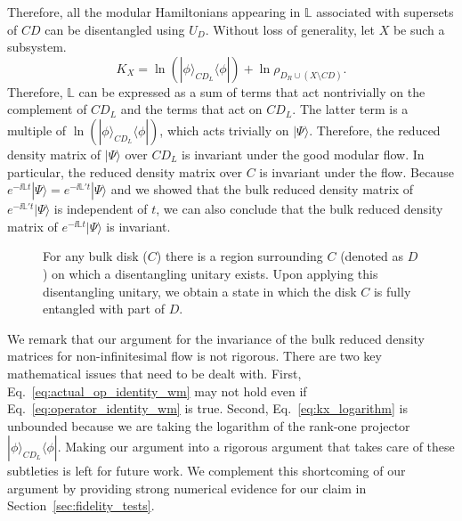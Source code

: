 \documentclass[12pt, nofootinbib]{article}
\theoremstyle{plain}
\theoremstyle{assumption}
\theoremstyle{definition}
\theoremstyle{plain}
\theoremstyle{plain}
\theoremstyle{plain}
\theoremstyle{plain}
\theoremstyle{plain}
\begin{document}
Therefore, all the modular Hamiltonians appearing in $\mathbb{L}$ associated with supersets of $CD$ can be disentangled using $U_D$. Without loss of generality, let $X$ be such a subsystem.
\begin{equation}
    K_X = \ln  \left(|\phi\rangle_{CD_L}\langle \phi| \right) + \ln  \rho_{D_R\cup(X\setminus CD)}. \label{eq:kx_logarithm}
\end{equation}
Therefore, $\mathbb{L}$ can be expressed as a sum of terms that act nontrivially on the complement of $CD_L$ and the terms that act on $CD_L$. The latter term is a multiple of $\ln  \left(|\phi\rangle_{CD_L}\langle \phi| \right)$, which acts trivially on $|\Psi\rangle$. Therefore, the reduced density matrix of $|\Psi\rangle$ over $CD_L$ is invariant under the good modular flow. In particular, the reduced density matrix over $C$ is invariant under the flow. Because $e^{-\ii\mathbb{L} t}|\Psi\rangle = e^{-\ii\mathbb{L}' t}|\Psi\rangle$ and we showed that the bulk reduced density matrix of $e^{-\ii\mathbb{L}' t}|\Psi\rangle$ is independent of $t$, we can also conclude that the bulk reduced density matrix of $e^{-\ii\mathbb{L} t}|\Psi\rangle$ is invariant. 

\begin{figure}[h]
    \centering
    \caption{For any bulk disk ($C$) there is a region surrounding $C$ (denoted as $D$) on which a disentangling unitary exists. Upon applying this disentangling unitary, we obtain a state in which the disk $C$ is fully entangled with part of $D$.}
    \label{fig:bulk_disentangling}
\end{figure}

We remark that our argument for the invariance of the bulk reduced density matrices for non-infinitesimal flow is not rigorous. There are two key mathematical issues that need to be dealt with. First, Eq.~\eqref{eq:actual_op_identity_wm} may not hold even if Eq.~\eqref{eq:operator_identity_wm} is true. Second, Eq.~\eqref{eq:kx_logarithm} is unbounded because we are taking the logarithm of the rank-one projector $|\phi\rangle_{CD_L}\langle \phi|$. Making our argument into a rigorous argument that takes care of these subtleties is left for future work. We complement this shortcoming of our argument by providing strong numerical evidence for our claim in Section~\ref{sec:fidelity_tests}.
\end{document}
